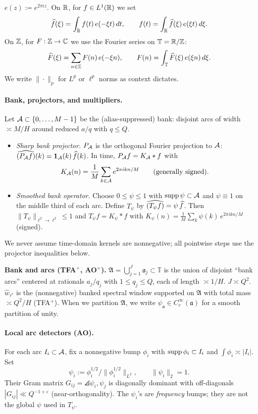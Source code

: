 $e(z):=e^{2\pi i z}$.  
On $\mathbb{R}$, for $f\in L^1(\mathbb{R})$ we set
\[
\widehat f(\xi)=\int_{\mathbb{R}} f(t)\,e(-\xi t)\,dt,\qquad
f(t)=\int_{\mathbb{R}} \widehat f(\xi)\,e(\xi t)\,d\xi.
\]
On $\mathbb{Z}$, for $F:\mathbb{Z}\to\mathbb{C}$ we use the Fourier series on $\mathbb T=\mathbb{R}/\mathbb{Z}$:
\[
\widehat F(\xi)=\sum_{n\in\mathbb{Z}} F(n)\,e(-\xi n),\qquad
F(n)=\int_{\mathbb T}\widehat F(\xi)\,e(\xi n)\,d\xi.
\]
We write $\|\cdot\|_p$ for $L^p$ or $\ell^p$ norms as context dictates.

\paragraph{Bank, projectors, and multipliers.}
Let $\mathcal{A}\subset\{0,\dots,M-1\}$ be the (alias-suppressed) bank: disjoint arcs of width $\asymp M/H$ around reduced $a/q$ with $q\le Q$.
\begin{itemize}
  \item \emph{Sharp bank projector.} $P_{\mathcal{A}}$ is the orthogonal Fourier projection to $\mathcal{A}$:
  $\widehat{(P_{\mathcal{A}} f)}(k)=\mathbf{1}_{\mathcal{A}}(k)\,\widehat f(k)$. In time, $P_{\mathcal{A}} f=K_{\mathcal{A}}*f$ with
  \[
  K_{\mathcal{A}}(n)=\frac{1}{M}\sum_{k\in\mathcal{A}} e^{2\pi i kn/M}\qquad\text{(generally signed)}.
  \]
  \item \emph{Smoothed bank operator.} Choose $0\le \psi\le 1$ with $\operatorname{supp}\psi\subset\mathcal{A}$ and $\psi\equiv 1$ on the middle third of each arc. Define $T_\psi$ by $\widehat{(T_\psi f)}=\psi\,\widehat f$. Then $\|T_\psi\|_{\ell^2\to \ell^2}\le 1$ and $T_\psi f=K_\psi * f$ with
  $K_\psi(n)=\frac{1}{M}\sum_k \psi(k)\,e^{2\pi i kn/M}$ (signed).
\end{itemize}
We never assume time-domain kernels are nonnegative; all pointwise steps use the projector inequalities below.

\textbf{Bank and arcs (TFA$^{+}$, AO$^{+}$).}
$\mathfrak A=\bigcup_{j=1}^{J}\mathfrak a_j\subset\mathbb T$ is the union of disjoint “bank arcs” centered at rationals $a_j/q_j$ with $1\le q_j\le Q$, each of length $\asymp 1/H$.  
$J\asymp Q^2$.  
$\widehat w_{\tau^\ast}$ is the (nonnegative) banked spectral window supported on $\mathfrak A$ with total mass $\asymp Q^2/H$ (TFA$^{+}$).  
When we partition $\mathfrak A$, we write $\psi_{\mathfrak a}\in C_c^\infty(\mathfrak a)$ for a smooth partition of unity.

\paragraph{Local arc detectors (AO).}
For each arc $I_i\subset\mathcal{A}$, fix a nonnegative bump $\phi_i$ with $\operatorname{supp}\phi_i\subset I_i$ and $\int\phi_i\asymp |I_i|$. Set
\[
\psi_i:=\phi_i^{1/2}\big/\|\phi_i^{1/2}\|_{L^2},\qquad \|\psi_i\|_{2}=1.
\]
Their Gram matrix $G_{ij}=\angles{\psi_i,\psi_j}$ is diagonally dominant with off-diagonals
$|G_{ij}|\ll Q^{-1+\varepsilon}$ (near-orthogonality). The $\psi_i$’s are \emph{frequency} bumps; they are not the global $\psi$ used in $T_\psi$.

